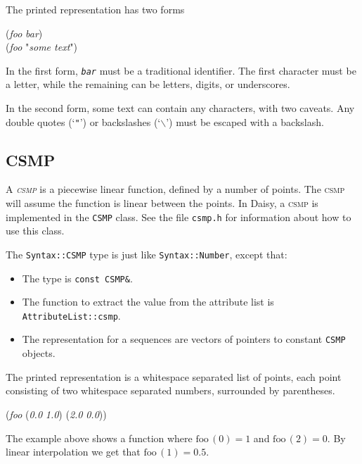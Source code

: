 \documentclass{article}
\newcommand{\cplusplus}%
{{\leavevmode{\rm{\hbox{C\hskip -0.1ex\raise 0.5ex\hbox{\tiny ++}}}}}}
\newcommand{\code}[1]{\texttt{#1}}
\newcommand{\file}[1]{\texttt{#1}}
\begin{document}
The printed representation has two forms
\begin{center}
  \begin{tt}
    (\textit{foo} \textit{bar})\\
    (\textit{foo} "\textit{some text}")
  \end{tt}
\end{center}

In the first form, \texttt{\textit{bar}} must be a traditional
identifier.  The first character must be a letter, while the remaining
can be letters, digits, or underscores.

In the second form, some text can contain any characters, with two
caveats.  Any double quotes (`\texttt{"}') or backslashes
(`\texttt{$\backslash{}$}') must be escaped with a backslash.

\subsection{CSMP}

A \emph{\textsc{csmp}} is a piecewise linear function, defined by a
number of points.  The \textsc{csmp} will assume the function is
linear between the points.  In Daisy, a \textsc{csmp} is implemented
in the \code{CSMP} class.  See the file \file{csmp.h} for information
about how to use this class.

The \code{Syntax::CSMP} type is just like \code{Syntax::Number},
except that:
\begin{itemize}
\item The \cplusplus{} type is \code{const CSMP\&}.
\item The function to extract the value from the attribute list is\\
  \code{AttributeList::csmp}. 
\item The \cplusplus{} representation for a sequences are vectors of
  pointers to constant \code{CSMP} objects.
\end{itemize}

The printed representation is a whitespace separated list of points,
each point consisting of two whitespace separated numbers, surrounded
by parentheses.
\begin{center}
  \begin{tt}
    (\textit{foo} (\textit{0.0} \textit{1.0}) (\textit{2.0} \textit{0.0}))
  \end{tt}
\end{center}
The example above shows a function where $\mbox{foo}\,(0) = 1$ and
$\mbox{foo}\,(2) = 0$. By linear interpolation we get that
$\mbox{foo}\,(1) = 0.5.$
\end{document}
